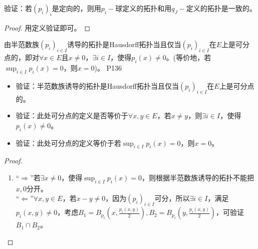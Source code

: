 \begin{proposition}
		验证：$若(p_{i})_{i}$是定向的，则用$p_{i}- $球定义的拓扑和用$q_{J}- $定义的拓扑是一致的。 
\end{proposition}

\begin{proof}
	用定义验证即可。
\end{proof}

\original
{
	由半范数族$(p_{i})_{i\in I} $诱导的拓扑是Hausdorff拓扑当且仅当$(p_{i})_{i\in I} $在$E $上是可分点的，即对$\forall x\in E $且$x\neq 0 $，$\exists i \in I $，使得$p_{i}(x)\neq 0 $。(等价地，若$\sup_{i\in I} p_{i}(x)=0$，则$x=0$)。
}
{P136}
\begin{proposition}
	\begin{itemize}
		\item 验证：半范数族诱导的拓扑是Hausdorff拓扑当且仅当$(p_{i})_{i\in I} $在$E$上是可分点的。
		\item 验证：此处可分点的定义是否等价于$\forall x,y\in E$，若$x\neq y $，则$\exists i\in I $，使得$p_{i}(x)\neq 0 $。
		\item 验证：此处可分点的定义等价于若$\sup_{i \in I} p_{i}(x) =0 $，则$x=0 $。
	\end{itemize}
\end{proposition}

\begin{proof}
	\begin{enumerate}
		\item “$\Rightarrow$”若$\exists x\neq  0$，使得$\sup_{i \in I}p_{i}(x)=0 $，则根据半范数族诱导的拓扑不能把$x,0$分开。\\
		“$\Leftarrow $”$\forall x,y\in E $，若$ x-y \neq 0$，因为$(p_{i})_{i\in I} $可分，所以$\exists i\in I $，满足$p_{i}(x,y)\neq 0 $，考虑$B_{1}=B_{p_{i}}(x,\frac{p_{i}(x,y)}{2}) ,B_{2}=B_{p_{i}}(y,\frac{p_{i}(x,y)}{2})$，可验证$B_{1}\cap B_{2} $。
	\end{enumerate}
\end{proof}














